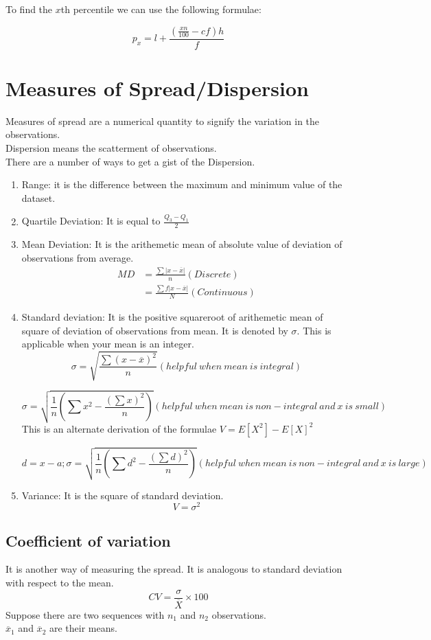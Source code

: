 \documentclass[11pt,letterpaper]{article}
\begin{document}
To find the $x$th percentile we can use the following formulae:

\[
  p_{x} =l + \frac{\left( \frac{x n}{100} - cf \right)h}{f} 
\]

\section{Measures of Spread/Dispersion}

Measures of spread are a numerical quantity to signify the variation in the observations.\\
Dispersion means the scatterment of observations. \\
There are a number of ways to get a gist of the Dispersion. 

\begin{enumerate}
  \item Range: it is the difference between the maximum and minimum value of the dataset. 
  \item Quartile Deviation: It is equal to $\frac{Q_3-Q_1}{2}$
  \item Mean Deviation: It is the arithemetic mean of absolute value of deviation of observations from average. 
    \begin{align*}
      MD &= \frac{\sum \lvert x - \overline{x} \rvert}{n} ( Discrete )\\
         &=  \frac{\sum f \lvert x - \overline{x} \rvert}{N} ( Continuous )
    \end{align*}
  \item Standard deviation: It is the positive squareroot of arithemetic mean of square of deviation of observations 
    from mean. It is denoted by $\sigma$. This is applicable when your mean is an integer.
    \[
      \sigma = \sqrt{\frac{\sum (x - \overline{x})^2}{n}} ( helpful\ when\ mean\ is\ integral )
    \]

    \[
      \sigma = \sqrt{\frac{1}{n}\left( \sum x^2 - \frac{(\sum x)^2}{n}\right)} ( helpful\ when\ mean\ is\ non-integral\ and\ x\ is\ small )
    \]
    This is an alternate derivation of the formulae $V = E[X^2]-E[X]^2$

    \[
      d = x-a; 
      \sigma = \sqrt{\frac{1}{n}\left( \sum d^2 - \frac{(\sum d)^2}{n}\right)} ( helpful\ when\ mean\ is\ non-integral\ and\ x\ is\ large )
    \]
  \item Variance: It is the square of standard deviation. 
    \[
      V = \sigma^2 
    \]
\end{enumerate}

\subsection{Coefficient of variation}
It is another way of measuring the spread. It is analogous to standard deviation with respect to the mean. 
\[
  CV = \frac{\sigma}{\overline{X}} \times 100
\]
Suppose there are two sequences with $n_1$ and $n_2$ observations. \\ 
$\overline{x}_1$ and $\overline{x}_2$ are their means. \\ 
\end{document}
